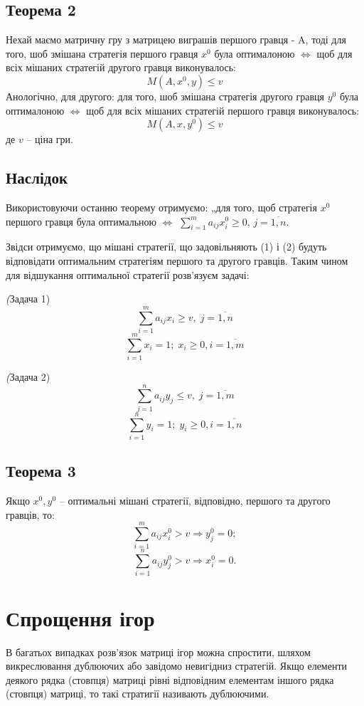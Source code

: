 \documentclass[12pt,a4paper]{book}
\begin{document}
\subsection{Теорема 2}

Нехай маємо матричну гру з матрицею виграшів першого гравця - A, тоді для того, шоб змішана стратегія першого гравця $x^0$ була оптималоною $\iff$ щоб для всіх мішаних стратегій другого гравця виконувалось:
\[M(A,x^0,y)\le v\]
Анологічно, для другого: для того, шоб змішана стратегія другого гравця $y^0$ була оптималоною $\iff$ щоб для всіх мішаних стратегій першого гравця виконувалось:
\[M(A,x,y^0)\le v\]
 де $v$ -- ціна гри.

\subsection{Наслідок}

Використовуючи останню теорему отримуємо: „для того, щоб стратегія $x^0$ першого гравця була оптимальною $\iff$ $\sum_{i=1}^m a_{ij} x_i^0 \ge 0, \, j=\overline{1, n}$.

Звідси отримуємо, що мішані стратегії, що задовільняють (1) і (2) будуть відповідати оптимальним стратегіям першого та другого гравців. Таким чином для відшукання оптимальної стратегії розв'язуєм задачі:

\emph(Задача 1)
\[\sum_{i=1}^m a_{ij}x_i \ge v, \; j=\overline{1, n}\]
\[\sum_{i=1}^m x_i = 1; \; x_i \ge 0, i =\overline{1, m} \]

\emph(Задача 2)
\[\sum_{j=1}^n a_{ij}y_j \le v, \; j=\overline{1, m}\]
\[\sum_{i=1}^n y_i = 1; \; y_i \ge 0, i =\overline{1, n} \]
\subsection{Теорема 3}
Якщо $x^0, y^0$ -- оптимальні мішані стратегії, відповідно, першого та другого гравців, то:
\[\sum_{i=1}^m a_{ij} x_i^0 > v \Rightarrow y_j^0 = 0;\]
\[\sum_{i=1}^n a_{ij} y_j^0 > v \Rightarrow x_i^0 = 0.\]

\section{Спрощення ігор}

В багатьох випадках розв'язок матриці ігор можна спростити, шляхом викреслювання дублюючих або завідомо невигідниз стратегій. Якщо елементи деякого рядка (стовпця) матриці рівні відповідним елементам іншого рядка (стовпця) матриці, то такі стратигії називають дублюючими.
\end{document}
